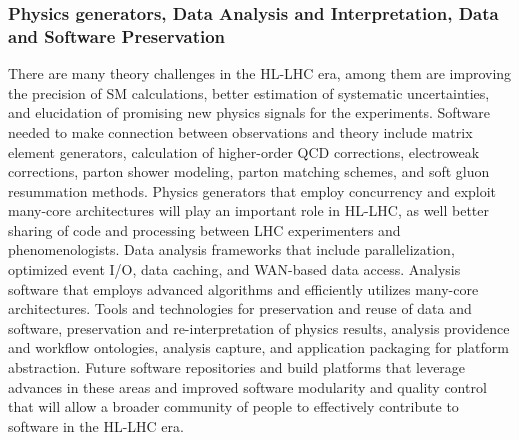 \begin{frame}
\frametitle{ Physics generators, Data Analysis and Interpretation, Data and Software Preservation}
\scriptsize{ 
There are many theory challenges in the HL-LHC era, among them are
improving the precision of SM calculations, better estimation of
systematic uncertainties, and elucidation of promising new physics
signals for the experiments. Software needed to make connection
between observations and theory include matrix element generators,
calculation of higher-order QCD corrections, electroweak
corrections, parton shower modeling, parton matching schemes, and
soft gluon resummation methods. Physics generators that employ
concurrency and exploit many-core architectures will play an
important role in HL-LHC, as well better sharing of code and
processing between LHC experimenters and phenomenologists. Data
analysis frameworks that include parallelization, optimized event
I/O, data caching, and WAN-based data access. Analysis software
that employs advanced algorithms and efficiently utilizes many-core
architectures. Tools and technologies for preservation and reuse of
data and software, preservation and re-interpretation of physics
results, analysis providence and workflow ontologies, analysis
capture, and application packaging for platform abstraction. Future
software repositories and build platforms that leverage advances in
these areas and improved software modularity and quality control
that will allow a broader community of people to effectively
contribute to software in the HL-LHC era.}

\end{frame}


